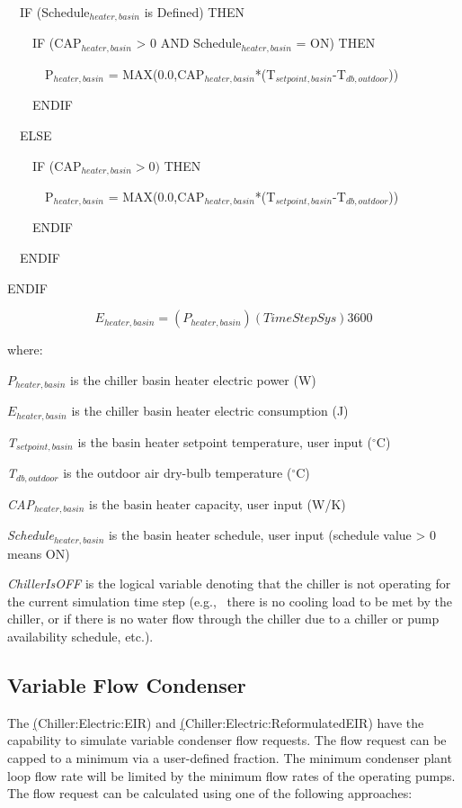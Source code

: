 ~~IF (Schedule\(_{heater,basin}\) is Defined) THEN

~~~~IF (CAP\(_{heater,basin}\) > 0 AND Schedule\(_{heater,basin}\) = ON) THEN

~~~~~~P\(_{heater,basin}\) = MAX(0.0,CAP\(_{heater,basin}\)*(T\(_{setpoint,basin}\)-T\(_{db,outdoor}\)))

~~~~ENDIF

~~ELSE

~~~~IF (CAP\(_{heater,basin} > 0)\) THEN

~~~~~~P\(_{heater,basin}\) = MAX(0.0,CAP\(_{heater,basin}\)*(T\(_{setpoint,basin}\)-T\(_{db,outdoor}\)))

~~~~ENDIF

~~ENDIF

ENDIF

\begin{equation}
{E_{heater,basin}} = \left( {{P_{heater,basin}}} \right)\left( {TimeStepSys} \right)3600
\end{equation}

where:

\({P_{heater,basin}}\) is the chiller basin heater electric power (W)

\({E_{heater,basin}}\) is the chiller basin heater electric consumption (J)

\emph{T\(_{setpoint,basin}\)} is the basin heater setpoint temperature, user input (\(^{\circ}\)C)

\emph{T\(_{db,outdoor}\)} is the outdoor air dry-bulb temperature (\(^{\circ}\)C)

\emph{CAP\(_{heater,basin}\)} is the basin heater capacity, user input (W/K)

\emph{Schedule\(_{heater,basin}\)} is the basin heater schedule, user input (schedule value \textgreater{} 0 means ON)

\emph{ChillerIsOFF} is the logical variable denoting that the chiller is not operating for the current simulation time step (e.g.,~ there is no cooling load to be met by the chiller, or if there is no water flow through the chiller due to a chiller or pump availability schedule, etc.). 

\subsection{Variable Flow Condenser}\label{hot-water-heat-recovery-from-chillers}

The \hyperref[electric-chiller-model-based-on-condenser-entering-temperature](Chiller:Electric:EIR) and \hyperref[electric-chiller-model-based-on-condenser-leaving-temperature](Chiller:Electric:ReformulatedEIR) have the capability to simulate variable condenser flow requests. The flow request can be capped to a minimum via a user-defined fraction. The minimum condenser plant loop flow rate will be limited by the minimum flow rates of the operating pumps. The flow request can be calculated using one of the following approaches:

